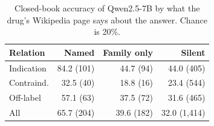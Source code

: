 \begin{table}[t]
\centering
\small
\setlength{\tabcolsep}{4pt}
\begin{tabular}{@{}lrrr@{}}
\toprule
Relation & Named & Family only & Silent \\
\midrule
Indication & 84.2 {\scriptsize(101)} & 44.7 {\scriptsize(94)} & 44.0 {\scriptsize(405)} \\
Contraind. & 32.5 {\scriptsize(40)} & 18.8 {\scriptsize(16)} & 23.4 {\scriptsize(544)} \\
Off-label & 57.1 {\scriptsize(63)} & 37.5 {\scriptsize(72)} & 31.6 {\scriptsize(465)} \\
\midrule
All & 65.7 {\scriptsize(204)} & 39.6 {\scriptsize(182)} & 32.0 {\scriptsize(1,414)} \\
\bottomrule
\end{tabular}
\caption{Closed-book accuracy of Qwen2.5-7B by what the drug's Wikipedia page says about the answer. Chance is 20\%.}
\label{tab:closedbook}
\end{table}
